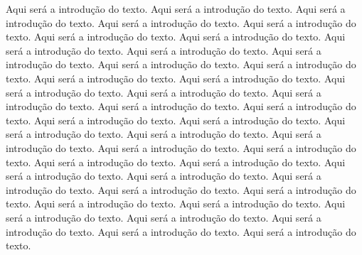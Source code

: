 Aqui será a introdução do texto. Aqui será a introdução do texto.
Aqui será a introdução do texto. Aqui será a introdução do texto.
Aqui será a introdução do texto. Aqui será a introdução do texto.
Aqui será a introdução do texto. Aqui será a introdução do texto.
Aqui será a introdução do texto. Aqui será a introdução do texto.
Aqui será a introdução do texto. Aqui será a introdução do texto.
Aqui será a introdução do texto. Aqui será a introdução do texto.
Aqui será a introdução do texto. Aqui será a introdução do texto.
Aqui será a introdução do texto. Aqui será a introdução do texto.
Aqui será a introdução do texto. Aqui será a introdução do texto.
Aqui será a introdução do texto. Aqui será a introdução do texto.
Aqui será a introdução do texto. Aqui será a introdução do texto.
Aqui será a introdução do texto. Aqui será a introdução do texto.
Aqui será a introdução do texto. Aqui será a introdução do texto.
Aqui será a introdução do texto. Aqui será a introdução do texto.
Aqui será a introdução do texto. Aqui será a introdução do texto.
Aqui será a introdução do texto. Aqui será a introdução do texto.
Aqui será a introdução do texto. Aqui será a introdução do texto.
Aqui será a introdução do texto. Aqui será a introdução do texto.
Aqui será a introdução do texto. Aqui será a introdução do texto.